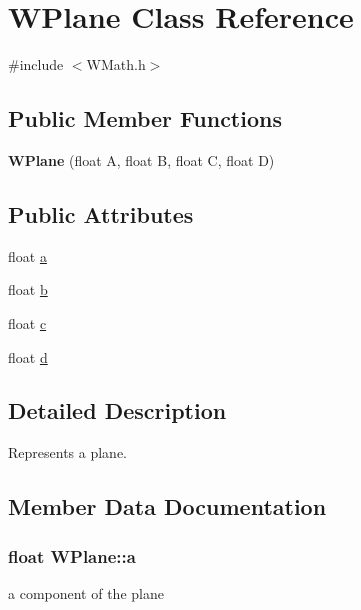 \hypertarget{class_w_plane}{}\section{W\+Plane Class Reference}
\label{class_w_plane}


{\ttfamily \#include $<$W\+Math.\+h$>$}

\subsection*{Public Member Functions}
\begin{DoxyCompactItemize}
\item 
{\bfseries W\+Plane} (float A, float B, float C, float D)\hypertarget{class_w_plane_aa72d5f7c1b534182696873bb039fab43}{}\label{class_w_plane_aa72d5f7c1b534182696873bb039fab43}

\end{DoxyCompactItemize}
\subsection*{Public Attributes}
\begin{DoxyCompactItemize}
\item 
float \hyperlink{class_w_plane_a002a4a2eea35e8a0aaf7c2e570313fa8}{a}
\item 
float \hyperlink{class_w_plane_a8e27948b3519661f4fabc7053e855412}{b}
\item 
float \hyperlink{class_w_plane_a7503d2b23e398ea2a38aa8f9f6a5b26d}{c}
\item 
float \hyperlink{class_w_plane_afe09f018ecc93649d6eaa1097f28aa5b}{d}
\end{DoxyCompactItemize}


\subsection{Detailed Description}
Represents a plane. 

\subsection{Member Data Documentation}
\subsubsection[{\texorpdfstring{a}{a}}]{\setlength{\rightskip}{0pt plus 5cm}float W\+Plane\+::a}\hypertarget{class_w_plane_a002a4a2eea35e8a0aaf7c2e570313fa8}{}\label{class_w_plane_a002a4a2eea35e8a0aaf7c2e570313fa8}
a component of the plane 

